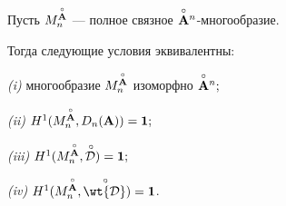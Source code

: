 \begin{thm}


Пусть $M^{\overset{\circ}{\bold A}{}}_n$ --- полное связное $\overset{\circ}{\bold A}{}^n$-многообразие.


Тогда следующие условия эквивалентны\/${:}$





{\em (i)} многообразие $M^{\overset{\circ}{\bold A}{}}_n$ изоморфно $\overset{\circ}{\bold A}{}^n;$





{\em (ii)}  $H^1 (M^{\overset{\circ}{\bold A}{}}_n,D_n({\bold A}))={\bold 1};$





{\em (iii)} $H^1 (M^{\overset{\circ}{\bold A}{}}_n,\overset{\,\circ}{\cal D}{})={\bold 1};$





{\em (iv)} $H^1(M^{\Ao}_n,\puto {\wt{\cal D}})={\bold 1}$.


\end{thm}








